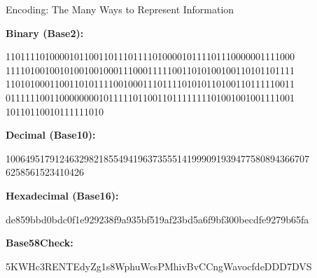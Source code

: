 \documentclass[]{beamer}
\begin{document}
\begin{frame}{Encoding: The Many Ways to Represent Information}
	
	\textbf{Binary (Base2):} 
	\begin{footnotesize}
		11011110100001011001101110111101000010111101110000001111000
		11110100100101001001000111000111110011010100100110101101111
		11010100011001101011110010001110111101010110100110111110011
		01111110011000000001011111011001101111111101001001001111001
		10110110010111111010
	\end{footnotesize}
	
	\vspace{0.2em}
	
	\textbf{Decimal (Base10):} 
	\begin{footnotesize}
		10064951791246329821855494196373555141999091939477580894366707
		6258561523410426
	\end{footnotesize}
	
	\vspace{0.2em}
	
	\textbf{Hexadecimal (Base16):} 
	\begin{footnotesize}
		de859bbd0bdc0f1e929238f9a935bf519af23bd5a6f9bf300becdfe9279b65fa
	\end{footnotesize}
	
	\vspace{0.2em}
	
	\textbf{Base58Check:} 
	\begin{footnotesize}
		5KWHc3RENTEdyZg1s8WphuWcsPMhivBvCCngWavocfdeDDD7DVS
	\end{footnotesize}
\end{frame}
\end{document}
